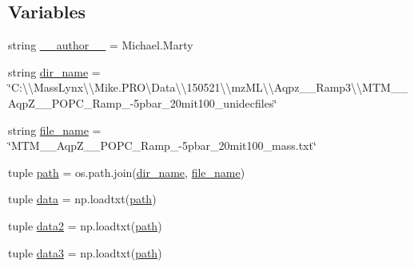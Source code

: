 \subsection*{Variables}
\begin{DoxyCompactItemize}
\item 
string \hyperlink{namespace_uni_dec_1_1unidec__modules_1_1_extract2_d_a80dd2d3d98987c97d9dd4790a9b5030a}{\+\_\+\+\_\+author\+\_\+\+\_\+} = \textquotesingle{}Michael.\+Marty\textquotesingle{}
\item 
string \hyperlink{namespace_uni_dec_1_1unidec__modules_1_1_extract2_d_ae4fa189fb1312a286a48ff9b8002148b}{dir\+\_\+name} = \char`\"{}C\+:\textbackslash{}\textbackslash{}\+Mass\+Lynx\textbackslash{}\textbackslash{}\+Mike.\+P\+R\+O\textbackslash{}\+Data\textbackslash{}\textbackslash{}150521\textbackslash{}\textbackslash{}mz\+M\+L\textbackslash{}\textbackslash{}\+Aqpz\+\_\+\_\+\+Ramp3\textbackslash{}\textbackslash{}\+M\+T\+M\+\_\+\_\+\+Aqp\+Z\+\_\+\_\+\+P\+O\+P\+C\+\_\+\+Ramp\+\_-\/5pbar\+\_\+20mit100\+\_\+unidecfiles\char`\"{}
\item 
string \hyperlink{namespace_uni_dec_1_1unidec__modules_1_1_extract2_d_a11fa49d078dcdcfd6bb2a3b139f4bddc}{file\+\_\+name} = \char`\"{}M\+T\+M\+\_\+\_\+\+Aqp\+Z\+\_\+\_\+\+P\+O\+P\+C\+\_\+\+Ramp\+\_-\/5pbar\+\_\+20mit100\+\_\+mass.\+txt\char`\"{}
\item 
tuple \hyperlink{namespace_uni_dec_1_1unidec__modules_1_1_extract2_d_a1901d7e3d20730f812e42060a3ac79d1}{path} = os.\+path.\+join(\hyperlink{namespace_uni_dec_1_1unidec__modules_1_1_extract2_d_ae4fa189fb1312a286a48ff9b8002148b}{dir\+\_\+name}, \hyperlink{namespace_uni_dec_1_1unidec__modules_1_1_extract2_d_a11fa49d078dcdcfd6bb2a3b139f4bddc}{file\+\_\+name})
\item 
tuple \hyperlink{namespace_uni_dec_1_1unidec__modules_1_1_extract2_d_a631595b08dc933d757bb574ffb81c40b}{data} = np.\+loadtxt(\hyperlink{namespace_uni_dec_1_1unidec__modules_1_1_extract2_d_a1901d7e3d20730f812e42060a3ac79d1}{path})
\item 
tuple \hyperlink{namespace_uni_dec_1_1unidec__modules_1_1_extract2_d_a784c0733bdfc7664522f4424544dd1cc}{data2} = np.\+loadtxt(\hyperlink{namespace_uni_dec_1_1unidec__modules_1_1_extract2_d_a1901d7e3d20730f812e42060a3ac79d1}{path})
\item 
tuple \hyperlink{namespace_uni_dec_1_1unidec__modules_1_1_extract2_d_a38e0fa19d93aef729352bba636150691}{data3} = np.\+loadtxt(\hyperlink{namespace_uni_dec_1_1unidec__modules_1_1_extract2_d_a1901d7e3d20730f812e42060a3ac79d1}{path})

\end{DoxyCompactItemize}
